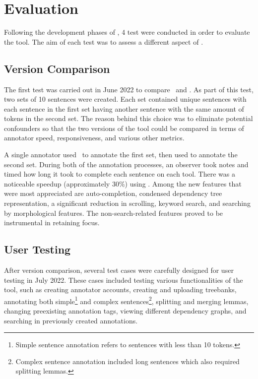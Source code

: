 \section{Evaluation}
\label{sec:evaluation}

Following the development phases of \boatvtwo, 4 test were conducted in order to evaluate the tool.
The aim of each test was to assess a different aspect of \boatvtwo.

\subsection{Version Comparison}
The first test was carried out in June 2022 to compare \boatvone\ and \boatvtwo.
As part of this test, two sets of 10 sentences were created.
Each set contained unique sentences with each sentence in the first set having another sentence with the same amount of tokens in the second set.
The reason behind this choice was to eliminate potential confounders so that the two versions of the tool could be compared in terms of annotator speed, responsiveness, and various other metrics.

A single annotator used \boatvone\ to annotate the first set, then used \boatvtwo to annotate the second set.
During both of the annotation processes, an observer took notes and timed how long it took to complete each sentence on each tool.
There was a noticeable speedup (approximately 30\%) using \boatvtwo.
Among the new features that were most appreciated are auto-completion, condensed dependency tree representation, a significant reduction in scrolling, keyword search, and searching by morphological features.
The non-search-related features proved to be instrumental in retaining focus.

\subsection{User Testing}
After version comparison, several test cases were carefully designed for user testing in July 2022.
These cases included testing various functionalities of the tool, such as creating annotator accounts, creating and uploading treebanks, annotating both simple\footnote{Simple sentence annotation refers to sentences with less than 10 tokens.} and complex sentences\footnote{Complex sentence annotation included long sentences which also required splitting lemmas.}, splitting and merging lemmas, changing preexisting annotation tags, viewing different dependency graphs, and searching in previously created annotations.

